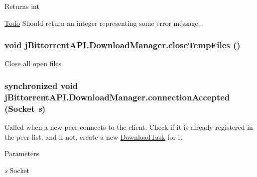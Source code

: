\begin{DoxyReturn}{Returns}
int 
\end{DoxyReturn}
\begin{Desc}
\item[\hyperlink{todo__todo000003}{Todo}]Should return an integer representing some error message... \end{Desc}
\hypertarget{classj_bittorrent_a_p_i_1_1_download_manager_af9d07141554f5d99cc69d928a62f4bb5}{
\subsubsection[{closeTempFiles}]{\setlength{\rightskip}{0pt plus 5cm}void jBittorrentAPI.DownloadManager.closeTempFiles ()}}
\label{classj_bittorrent_a_p_i_1_1_download_manager_af9d07141554f5d99cc69d928a62f4bb5}
Close all open files \hypertarget{classj_bittorrent_a_p_i_1_1_download_manager_a5e63578834159ff3471d3f6cfe6bfc5d}{
\subsubsection[{connectionAccepted}]{\setlength{\rightskip}{0pt plus 5cm}synchronized void jBittorrentAPI.DownloadManager.connectionAccepted (Socket {\em s})}}
\label{classj_bittorrent_a_p_i_1_1_download_manager_a5e63578834159ff3471d3f6cfe6bfc5d}
Called when a new peer connects to the client. Check if it is already registered in the peer list, and if not, create a new \hyperlink{classj_bittorrent_a_p_i_1_1_download_task}{DownloadTask} for it 
\begin{DoxyParams}{Parameters}
\item[{\em s}]Socket \end{DoxyParams}


